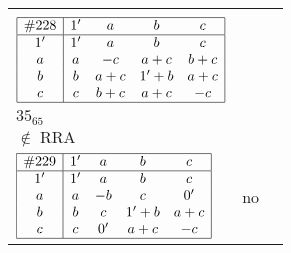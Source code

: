 \documentclass[12pt]{article}
\theoremstyle{definition}
\newcommand\RRA{\operatorname{RRA}}
\newcommand\notRRA{\ensuremath{\notin \RRA}}
\newcommand{\join}{\mathbin{+}}%
\newcommand{\id}{{1'}}%
\renewcommand{\div}{0'}
\begin{document}
\begin{center}
\begin{longtable}{l|c|c}
{\begin{tikzpicture}[<->,shorten <=1pt,shorten >=1pt,label distance=0mm, font=\small]
\end{tikzpicture}
}      \\[15mm]

$
\begin{array}{|c|cccc|} \hline
\#228 & \id & a & b & c \\ \hline
\id & \id & a & b & c \\
a & a & -c & a \join c & b \join c \\
b & b & a \join c & \id \join b & a \join c \\
c & c & b \join c & a \join c & -c \\ \hline
\end{array}
$
 & \begin{tabular}{c} yes \\ $35_{65}$ \\ \notRRA \end{tabular} 
 & \adjustbox{valign=c, max height=1.6cm}{$
\left[ \begin{array}{cccccc}
\id & a & a & b & c & b \\ 
a & \id & a & a & b & c \\ 
a & a & \id & a & c & c \\ 
b & a & a & \id & c & b \\ 
c & b & c & c & \id & a \\ 
b & c & c & b & a & \id
\end{array}\right]
$}      \\[15mm]

$
\begin{array}{|c|cccc|} \hline
\#229 & \id & a & b & c \\ \hline
\id & \id & a & b & c \\
a & a & -b & c & \div \\
b & b & c & \id \join b & a \join c \\
c & c & \div & a \join c & -c \\ \hline
\end{array}
$
 & no  
 & \adjustbox{valign=c, max height=1.6cm}{$
\left[ \begin{array}{cccccc}
\id & a & a & c & a & c \\ 
a & \id & a & a & c & c \\ 
a & a & \id & c & c & c \\ 
c & a & c & \id & b & b \\ 
a & c & c & b & \id & b \\ 
c & c & c & b & b & \id
\end{array}\right]
$}      \\[15mm]


\end{longtable}
\end{center}
\end{document}
